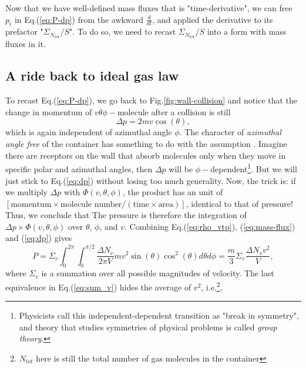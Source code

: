 Now that we have well-defined mass fluxes that is "time-derivative", we can free $ p_i $ in Eq.(\ref{eq:P-dp}) from the awkward $ \frac{d}{dt} $, and applied the derivative to its prefactor "$ \Sigma_{N_{tot}}/S $". To do so, we need to recast $ \Sigma_{N_{tot}}/S $ into a form with mass fluxes in it.

\subsection{A ride back to ideal gas law}
To recast Eq.(\ref{eq:P-dp}), we go back to Fig.\ref{fig:wall-collision} and notice that the change in momentum of $ v\theta\phi- $molecule after a collision is still 
\begin{equation}
	\Delta p = 2mv\cos(\theta),
	\label{eq:dp}
\end{equation}
which is again independent of azimuthal angle $ \phi $. The character of \textit{azimuthal angle free} of the container has something to do with the assumption . Imagine there are receptors on the wall that absorb molecules only when they move in specific polar and azimuthal angles, then $ \Delta p $ will be $ \phi- $dependent\footnote{Physicists call this independent-dependent transition as "break in symmetry", and theory that studies symmetries of physical problems is called \textit{group theory}.}. But we will just stick to Eq.(\ref{eq:dp}) without losing too much generality. Now, the trick is: if we multiply $ \Delta p $ with $ \Phi(v,\theta,\phi) $, the product has an unit of $ [\text{momentum}\times \text{molecule number}/(\text{time}\times\text{area})] $, identical to that of pressure! Thus, we conclude that  The pressure is therefore the integration of $ \Delta p\times\Phi(v,\theta,\phi) $ over $ \theta $, $ \phi $, and $ v $. Combining Eq.(\ref{eq:rho_vtp}), (\ref{eq:mass-flux}) and (\ref{eq:dp}) gives
\begin{equation}
	P = \Sigma_{v}\int_0^{2\pi}\int_0^{\pi/2}\frac{\Delta N_v}{2\pi V}mv^2\sin(\theta)\cos^2(\theta)d\theta d\phi=\frac{m}{3}\Sigma_{v}\frac{\Delta N_vv^2}{V},
	\label{eq:sum_v}
\end{equation}
where $ \Sigma_v $ is a summation over all possible magnitudes of velocity. The last equivalence in Eq.(\ref{eq:sum_v}) hides the average of $ v^2 $, i.e.\footnote{$ N_{tot} $ here is still the total number of gas molecules in the container},
